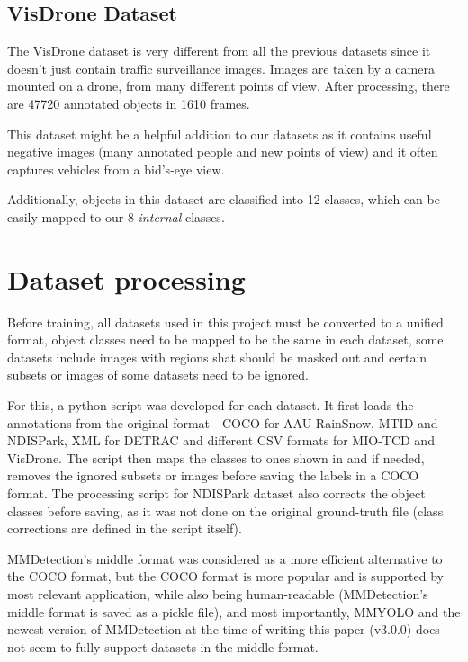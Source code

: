 \subsection*{VisDrone Dataset}

The VisDrone dataset \cite{Zhu2022} is very different from all the previous
datasets since it doesn't just contain traffic surveillance images. Images are
taken by a camera mounted on a drone, from many different points of view. After
processing, there are \num{47720} annotated objects in \num{1610} frames.

This dataset might be a helpful addition to our datasets as it contains useful
negative images (many annotated people and new points of view) and it often
captures vehicles from a bid's-eye view.

Additionally, objects in this dataset are classified into 12 classes, which can
be easily mapped to our 8 \textit{internal} classes.


\section{Dataset processing}


Before training, all datasets used in this project must be converted to a
unified format, object classes need to be mapped to be the same in each dataset,
some datasets include images with regions shat should be masked out and certain
subsets or images of some datasets need to be ignored.

For this, a python script was developed for each dataset. It first loads the
annotations from the original format - COCO  for AAU RainSnow, MTID
and NDISPark, XML for DETRAC and different CSV formats for MIO-TCD and VisDrone.
The script then maps the classes to ones shown in  and if needed,
removes the ignored subsets or images before saving the labels in a COCO format.
The processing script for NDISPark dataset also corrects the object classes
before saving, as it was not done on the original ground-truth  file (class corrections are defined in the script itself).

MMDetection's middle format was considered as a more efficient alternative to
the COCO format, but the COCO format is more popular and is supported by most
relevant application, while also being human-readable (MMDetection's middle
format is saved as a pickle  file), and most importantly, MMYOLO
and the newest version of MMDetection at the time of writing this paper (v3.0.0)
does not seem to fully support datasets in the middle format.

